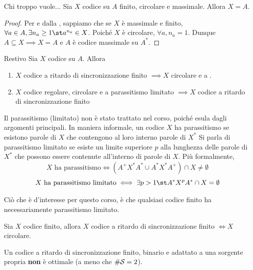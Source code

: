 \begin{proposition}{Chi troppo vuole...}
  Sia \(X\) codice su \(A\) finito, circolare e massimale. Allora \(X = A\).
\end{proposition}

\begin{proof}
  Per  e dalla , sappiamo che se \(X\) è massimale e finito, \(\forall a \in A, \exists n_a \geq 1 \st a^{n_a} \in X\).
  Poiché \(X\) è circolare, \(\forall a, n_a = 1\).
  Dunque \(A \subseteq X \implies X = A\) e $A$ è codice massimale su \(A^*\).
\end{proof}

\begin{theorem}{Restivo}
  Sia \(X\) codice su \(A\). Allora
  \begin{enumerate}
    \item \(X\) codice a ritardo di sincronizzazione finito \(\implies X\) circolare e a .
    \item \(X\) codice regolare, circolare e a parassitismo limitato \(\implies X\) codice a ritardo di sincronizzazione finito
  \end{enumerate}
\end{theorem}

\begin{note}{}
  Il parassitismo (limitato) non è stato trattato nel corso, poiché esula dagli argomenti principali.
  In maniera informale, un codice \(X\) ha parassitismo se esistono parole di \(X\) che contengono al loro interno parole di \(X^*\)
  Si parla di parassitismo limitato se esiste un limite superiore \(p\) alla lunghezza delle parole di \(X^*\) che possono essere contenute all'interno di parole di \(X\).
  Più formalmente,
  \[X \text{ ha parassitismo} \iff (A^+X^* A^*\cup A^*X^*A^+) \cap X \neq \emptyset\]
  \[X \text{ ha parassitismo limitato} \iff \exists p > 1 \st A^*X^p A^* \cap X = \emptyset\]

  Ciò che è d'interesse per questo corso, è che qualsiasi codice finito ha necessariamente parassitismo limitato.
\end{note}

\begin{corollary}{}
  Sia \(X\) codice finito, allora \(X\) codice a ritardo di sincronizzazione finito \(\iff X\) circolare.
\end{corollary}

\begin{corollary}{}
  Un codice a ritardo di sincronizzazione finito, binario e adattato a una sorgente propria \textbf{non} è ottimale (a meno che \(\# \mathcal{S} = 2\)).
\end{corollary}

